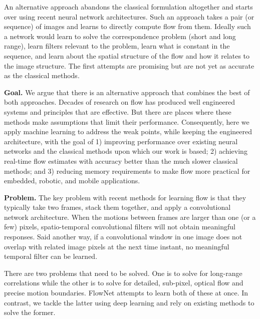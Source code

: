 \documentclass[10pt,twocolumn,letterpaper]{article}
\begin{document}
An alternative approach abandons the classical formulation altogether and starts over using recent neural network architectures.  
Such an approach takes a pair (or sequence) of images and learns to directly compute flow from them.
Ideally such a network would learn to solve the correspondence problem (short and long range), learn filters relevant to the problem, learn what is constant in the sequence, and learn about the spatial structure of the flow and how it relates to the image structure.
The first attempts are promising but are not yet as accurate as the classical methods.%

{\bf Goal.}
We argue that there is an alternative approach that combines the best of both approaches.
Decades of research on flow has produced well engineered systems and principles that are effective.
But there are places where these methods make assumptions that limit their performance.
Consequently, here we apply machine learning to address the weak points, while keeping the engineered architecture, with the goal of 1) improving performance over existing neural networks and the classical methods upon which our work is based;
2) achieving real-time flow estimates with accuracy better than the much slower classical methods; and 3) reducing memory requirements to make flow more practical for embedded, robotic, and mobile applications.

{\bf Problem.} 
The key problem with recent methods for learning flow \cite{dosovitskiy2015flownet} 
is that they typically take two frames, stack them together, and apply a convolutional network architecture.
When the motions between frames are larger than one (or a few) pixels, spatio-temporal convolutional filters will not obtain meaningful responses.
Said another way, if a convolutional window in one image does not overlap with related image pixels at the next time instant, no meaningful temporal filter can be learned.

There are two problems that need to be solved.
One is to solve for long-range correlations while the other is to solve for detailed, sub-pixel, optical flow and precise motion boundaries.
FlowNet \cite{dosovitskiy2015flownet} attempts to learn both of these at once.
In contrast, we tackle the latter using deep learning and rely on existing methods to solve the former.
\end{document}

